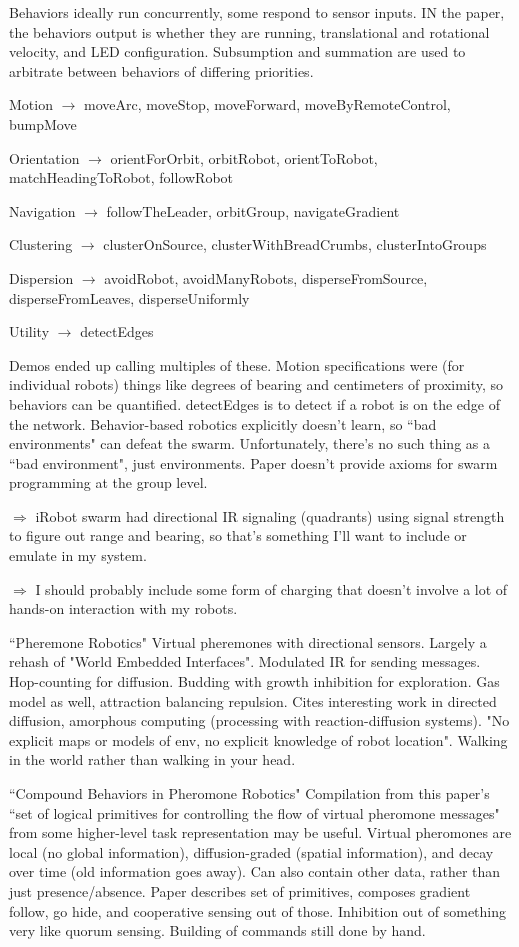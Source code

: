 \documentclass[]{article}
\begin{document}
Behaviors ideally run concurrently, some respond to sensor inputs. IN the paper, the behaviors output is whether they are running, translational and rotational velocity, and LED configuration. Subsumption and summation are used to arbitrate between behaviors of differing priorities. 

Motion $\rightarrow$ moveArc, moveStop, moveForward, moveByRemoteControl, bumpMove

Orientation $\rightarrow$ orientForOrbit, orbitRobot, orientToRobot, matchHeadingToRobot, followRobot

Navigation $\rightarrow$ followTheLeader, orbitGroup, navigateGradient

Clustering $\rightarrow$ clusterOnSource, clusterWithBreadCrumbs, clusterIntoGroups

Dispersion $\rightarrow$ avoidRobot, avoidManyRobots, disperseFromSource, disperseFromLeaves, disperseUniformly

Utility $\rightarrow$ detectEdges

Demos ended up calling multiples of these. Motion specifications were (for individual robots) things like degrees of bearing and centimeters of proximity, so behaviors can be quantified. detectEdges is to detect if a robot is on the edge of the network. Behavior-based robotics explicitly doesn't learn, so ``bad environments" can defeat the swarm. Unfortunately, there's no such thing as a ``bad environment", just environments. Paper doesn't provide axioms for swarm programming at the group level. 

$\Rightarrow$ iRobot swarm had directional IR signaling (quadrants) using signal strength to figure out range and bearing, so that's something I'll want to include or emulate in my system. 

$\Rightarrow$ I should probably include some form of charging that doesn't involve a lot of hands-on interaction with my robots. 

``Pheremone Robotics" \cite{payton2001pheromone} Virtual pheremones with directional sensors. Largely a rehash of "World Embedded Interfaces". Modulated IR for sending messages. Hop-counting for diffusion. Budding with growth inhibition for exploration. Gas model as well, attraction balancing repulsion. Cites interesting work in directed diffusion, amorphous computing (processing with reaction-diffusion systems). "No explicit maps or models of env, no explicit knowledge of robot location". Walking in the world rather than walking in your head. 

``Compound Behaviors in Pheromone Robotics" \cite{payton2003compound} Compilation from this paper's ``set of logical primitives for controlling the flow of virtual pheromone messages" from some higher-level task representation may be useful. Virtual pheromones are local (no global information), diffusion-graded (spatial information), and decay over time (old information goes away). Can also contain other data, rather than just presence/absence. Paper describes set of primitives, composes gradient follow, go hide, and cooperative sensing out of those. Inhibition out of something very like quorum sensing. Building of commands still done by hand. 
\end{document}
